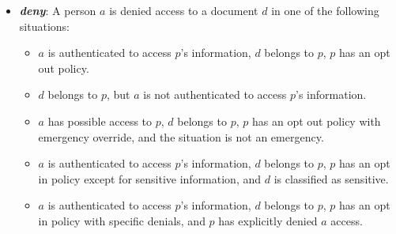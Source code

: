 \documentclass[conference]{IEEEtran}
\begin{document}
\begin{itemize}
\item \textbf{\textit{deny}}: A person $a$ is denied access to a document $d$ in one of the following situations:
\begin{itemize}
 \item $a$ is authenticated to access $p$'s information, $d$ belongs to $p$, $p$ has an opt out policy.
\item $d$ belongs to $p$, but $a$ is not authenticated to access $p$'s information.
\item $a$ has possible access to $p$, $d$ belongs to $p$, $p$ has an opt out policy with emergency override, and the situation is not an emergency.
\item $a$ is authenticated to access $p$'s information, $d$ belongs to $p$, $p$ has an opt in policy except for sensitive information, and $d$ is classified as
sensitive.
\item $a$ is authenticated to access $p$'s information, $d$ belongs to $p$, $p$ has an opt in policy with specific denials, and $p$ has explicitly denied $a$
access.
\end{itemize}

\end{itemize}
\end{document}
